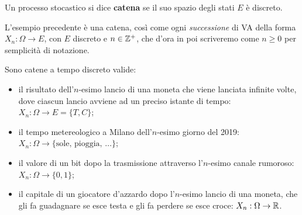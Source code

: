 \begin{defn}\label{catena}
	Un processo stocastico si dice \textbf{catena} se il suo spazio degli stati $E$ è discreto.
\end{defn}

\begin{ese}
	L'esempio precedente è una catena, così come ogni \textit{successione} di VA della forma $X_n: \Omega \to E$,
	con $E$ discreto e $n \in \mathbb Z^+$, che d'ora in poi scriveremo come $n \ge 0$ per semplicità di notazione.
\end{ese}

\begin{ese}
	Sono catene a tempo discreto valide:
	\begin{itemize}
		\item il risultato dell'$n$-esimo lancio di una moneta che viene lanciata infinite volte,
		 	dove ciascun lancio avviene ad un preciso istante di tempo: $X_n: \Omega \to E = \{T, C\}$;
		\item il tempo metereologico a Milano dell'$n$-esimo giorno del 2019: $X_n: \Omega \to \{\text{sole},\, \text{pioggia},\, \dots\}$;
		\item il valore di un bit dopo la trasmissione attraverso l'$n$-esimo canale rumoroso: $X_n: \Omega \to \{0,1\}$;
		\item il capitale di un giocatore d'azzardo dopo l'$n$-esimo lancio di una moneta,
			che gli fa guadagnare se esce testa e gli fa perdere se esce croce: $X_n: \Omega \to \mathbb R$.
	\end{itemize}
\end{ese}

